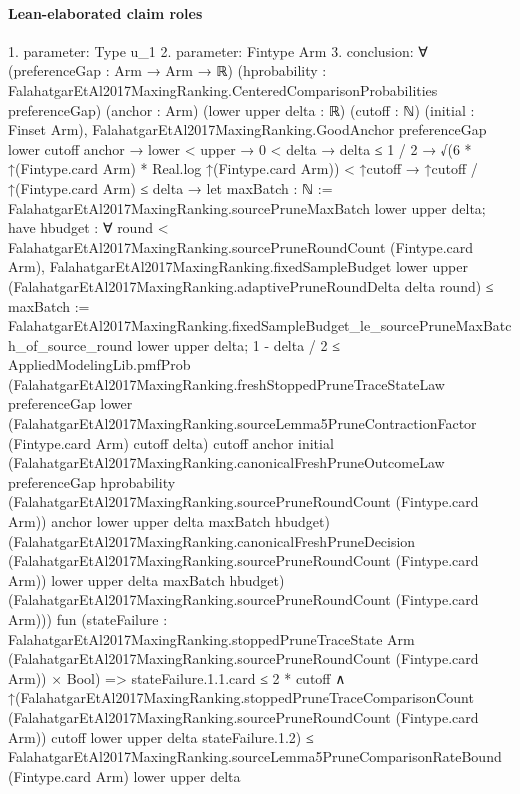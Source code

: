 \documentclass[10pt]{article}
\begin{document}
\paragraph{Lean-elaborated claim roles}\begin{ReviewVerbatim}
1. parameter: Type u_1
2. parameter: Fintype Arm
3. conclusion: ∀ (preferenceGap : Arm → Arm → ℝ)
  (hprobability : FalahatgarEtAl2017MaxingRanking.CenteredComparisonProbabilities preferenceGap) (anchor : Arm)
  (lower upper delta : ℝ) (cutoff : ℕ) (initial : Finset Arm),
  FalahatgarEtAl2017MaxingRanking.GoodAnchor preferenceGap lower cutoff anchor →
    lower < upper →
      0 < delta →
        delta ≤ 1 / 2 →
          √(6 * ↑(Fintype.card Arm) * Real.log ↑(Fintype.card Arm)) < ↑cutoff →
            ↑cutoff / ↑(Fintype.card Arm) ≤ delta →
              let maxBatch : ℕ := FalahatgarEtAl2017MaxingRanking.sourcePruneMaxBatch lower upper delta;
              have hbudget :
                ∀ round < FalahatgarEtAl2017MaxingRanking.sourcePruneRoundCount (Fintype.card Arm),
                  FalahatgarEtAl2017MaxingRanking.fixedSampleBudget lower upper
                      (FalahatgarEtAl2017MaxingRanking.adaptivePruneRoundDelta delta round) ≤
                    maxBatch :=
                FalahatgarEtAl2017MaxingRanking.fixedSampleBudget_le_sourcePruneMaxBatch_of_source_round lower upper
                  delta;
              1 - delta / 2 ≤
                AppliedModelingLib.pmfProb
                  (FalahatgarEtAl2017MaxingRanking.freshStoppedPruneTraceStateLaw preferenceGap lower
                    (FalahatgarEtAl2017MaxingRanking.sourceLemma5PruneContractionFactor (Fintype.card Arm) cutoff delta)
                    cutoff anchor initial
                    (FalahatgarEtAl2017MaxingRanking.canonicalFreshPruneOutcomeLaw preferenceGap hprobability
                      (FalahatgarEtAl2017MaxingRanking.sourcePruneRoundCount (Fintype.card Arm)) anchor lower upper
                      delta maxBatch hbudget)
                    (FalahatgarEtAl2017MaxingRanking.canonicalFreshPruneDecision
                      (FalahatgarEtAl2017MaxingRanking.sourcePruneRoundCount (Fintype.card Arm)) lower upper delta
                      maxBatch hbudget)
                    (FalahatgarEtAl2017MaxingRanking.sourcePruneRoundCount (Fintype.card Arm)))
                  fun
                    (stateFailure :
                      FalahatgarEtAl2017MaxingRanking.stoppedPruneTraceState Arm
                          (FalahatgarEtAl2017MaxingRanking.sourcePruneRoundCount (Fintype.card Arm)) ×
                        Bool) =>
                  stateFailure.1.1.card ≤ 2 * cutoff ∧
                    ↑(FalahatgarEtAl2017MaxingRanking.stoppedPruneTraceComparisonCount
                          (FalahatgarEtAl2017MaxingRanking.sourcePruneRoundCount (Fintype.card Arm)) cutoff lower upper
                          delta stateFailure.1.2) ≤
                      FalahatgarEtAl2017MaxingRanking.sourceLemma5PruneComparisonRateBound (Fintype.card Arm) lower
                        upper delta
\end{ReviewVerbatim}
\end{document}
